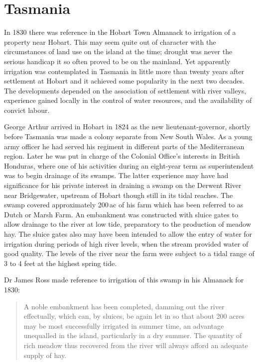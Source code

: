 \section*{Tasmania}
\label{sec:tas}

In 1830 there was reference in the Hobart Town Almanack to irrigation
of a property near Hobart.  This may seem quite out of character with
the circumstances of land use on the island at the time; drought was
never the serious handicap it so often proved to be on the mainland.
Yet apparently irrigation was contemplated in Tasmania in little more
than twenty years after settlement at Hobart and it achieved some
popularity in the next two decades.  The developments depended on the
association of settlement with river valleys, experience gained
locally in the control of water resources, and the availability of
convict labour.

George Arthur arrived in Hobart in 1824 as the new
lieutenant-governor, shortly before Tasmania was made a colony
separate from New South Wales.  As a young army officer he had served
his regiment in different parts of the Mediterranean region.  Later he
was put in charge of the Colonial Office's interests in British
Honduras, where one of his activities during an eight-year term as
superintendent was to begin drainage of its swamps.  The latter
experience may have had significance for his private interest in
draining a swamp on the Derwent River near Bridgewater, upstream of
Hobart though still in its tidal reaches. The swamp covered
approximately 200\,ac of his farm which has been referred to as Dutch
or Marsh Farm.  An embankment was constructed with sluice gates to
allow drainage to the river at low tide, preparatory to the production
of meadow hay.  The sluice gates also may have been intended to allow
the entry of water for irrigation during periods of high river levels,
when the stream provided water of good quality.  The levels of the
river near the farm were subject to a tidal range of 3 to 4 feet at
the highest spring tide.

Dr James Ross made reference to irrigation of this swamp in his
Almanack for 1830:
\begin{quote}
	A noble embankment has been completed, damming out the river
        effectually, which can, by sluices, be again let in so that
        about 200 acres may be most successfully irrigated in summer
        time, an advantage unequalled in the island, particularly in a
        dry summer. The quantity of rich meadow thus recovered from
        the river will always afford an adequate supply of
        hay.
\end{quote}

